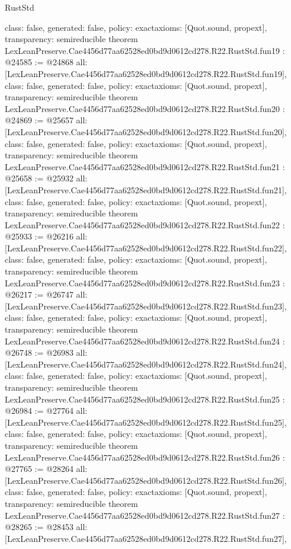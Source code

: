 \begin{lexlean}{RustStd}
\begin{coremodule}
{  class: false,
  generated: false,
  policy: exact{axioms: [Quot.sound, propext]},
  transparency: semireducible
}
theorem LexLeanPreserve.Cae4456d77aa62528ed0bd9d0612cd278.R22.RustStd.fun19 : @24585 := @24868 {
  all: [LexLeanPreserve.Cae4456d77aa62528ed0bd9d0612cd278.R22.RustStd.fun19],
  class: false,
  generated: false,
  policy: exact{axioms: [Quot.sound, propext]},
  transparency: semireducible
}
theorem LexLeanPreserve.Cae4456d77aa62528ed0bd9d0612cd278.R22.RustStd.fun20 : @24869 := @25657 {
  all: [LexLeanPreserve.Cae4456d77aa62528ed0bd9d0612cd278.R22.RustStd.fun20],
  class: false,
  generated: false,
  policy: exact{axioms: [Quot.sound, propext]},
  transparency: semireducible
}
theorem LexLeanPreserve.Cae4456d77aa62528ed0bd9d0612cd278.R22.RustStd.fun21 : @25658 := @25932 {
  all: [LexLeanPreserve.Cae4456d77aa62528ed0bd9d0612cd278.R22.RustStd.fun21],
  class: false,
  generated: false,
  policy: exact{axioms: [Quot.sound, propext]},
  transparency: semireducible
}
theorem LexLeanPreserve.Cae4456d77aa62528ed0bd9d0612cd278.R22.RustStd.fun22 : @25933 := @26216 {
  all: [LexLeanPreserve.Cae4456d77aa62528ed0bd9d0612cd278.R22.RustStd.fun22],
  class: false,
  generated: false,
  policy: exact{axioms: [Quot.sound, propext]},
  transparency: semireducible
}
theorem LexLeanPreserve.Cae4456d77aa62528ed0bd9d0612cd278.R22.RustStd.fun23 : @26217 := @26747 {
  all: [LexLeanPreserve.Cae4456d77aa62528ed0bd9d0612cd278.R22.RustStd.fun23],
  class: false,
  generated: false,
  policy: exact{axioms: [Quot.sound, propext]},
  transparency: semireducible
}
theorem LexLeanPreserve.Cae4456d77aa62528ed0bd9d0612cd278.R22.RustStd.fun24 : @26748 := @26983 {
  all: [LexLeanPreserve.Cae4456d77aa62528ed0bd9d0612cd278.R22.RustStd.fun24],
  class: false,
  generated: false,
  policy: exact{axioms: [Quot.sound, propext]},
  transparency: semireducible
}
theorem LexLeanPreserve.Cae4456d77aa62528ed0bd9d0612cd278.R22.RustStd.fun25 : @26984 := @27764 {
  all: [LexLeanPreserve.Cae4456d77aa62528ed0bd9d0612cd278.R22.RustStd.fun25],
  class: false,
  generated: false,
  policy: exact{axioms: [Quot.sound, propext]},
  transparency: semireducible
}
theorem LexLeanPreserve.Cae4456d77aa62528ed0bd9d0612cd278.R22.RustStd.fun26 : @27765 := @28264 {
  all: [LexLeanPreserve.Cae4456d77aa62528ed0bd9d0612cd278.R22.RustStd.fun26],
  class: false,
  generated: false,
  policy: exact{axioms: [Quot.sound, propext]},
  transparency: semireducible
}
theorem LexLeanPreserve.Cae4456d77aa62528ed0bd9d0612cd278.R22.RustStd.fun27 : @28265 := @28453 {
  all: [LexLeanPreserve.Cae4456d77aa62528ed0bd9d0612cd278.R22.RustStd.fun27],
}
\end{coremodule}
\end{lexlean}

